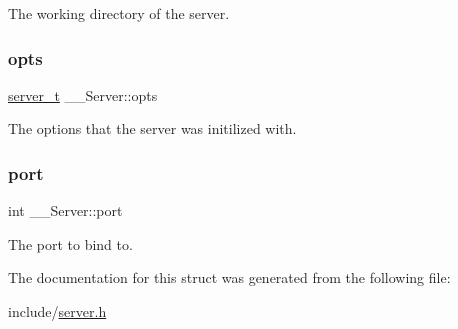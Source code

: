 The working directory of the server. 

\mbox{\label{struct_____server_a7bedad78c4a7e7dc2045067cb99dc237}} 
\subsubsection{\texorpdfstring{opts}{opts}}
{\footnotesize\ttfamily \mbox{\hyperlink{server_8h_ac716a2b0d74f0b48cf81937cb7b3f725}{server\+\_\+t}} \+\_\+\+\_\+\+Server\+::opts}



The options that the server was initilized with. 

\mbox{\label{struct_____server_a4b1f796c585e0682d0284c210fd98ce3}} 
\subsubsection{\texorpdfstring{port}{port}}
{\footnotesize\ttfamily int \+\_\+\+\_\+\+Server\+::port}



The port to bind to. 



The documentation for this struct was generated from the following file\+:\begin{DoxyCompactItemize}
\item 
include/\mbox{\hyperlink{server_8h}{server.\+h}}\end{DoxyCompactItemize}
